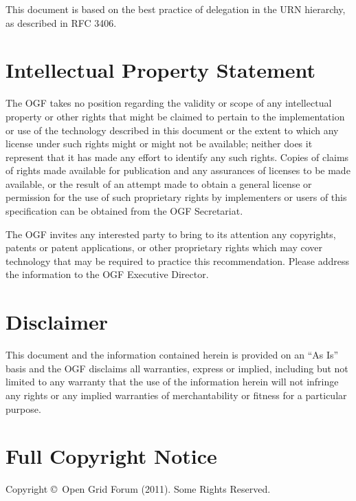 \documentclass[12pt]{article}  %
\newcommand{\copyrightyears}{2011}  %
\begin{document}
This document is based on the best practice of delegation in the URN hierarchy, 
as described in RFC 3406.

\section*{Intellectual Property Statement}

The OGF takes no position regarding the validity or scope of any intellectual
property or other rights that might be claimed to pertain to the
implementation or use of the technology described in this document or the
extent to which any license under such rights might or might not be
available; neither does it represent that it has made any effort to identify
any such rights. Copies of claims of rights made available for publication
and any assurances of licenses to be made available, or the result of an
attempt made to obtain a general license or permission for the use of such
proprietary rights by implementers or users of this specification can be
obtained from the OGF Secretariat.

The OGF invites any interested party to bring to its attention any
copyrights, patents or patent applications, or other proprietary rights which
may cover technology that may be required to practice this recommendation.
Please address the information to the OGF Executive Director.

\section*{Disclaimer}

This document and the information contained herein is provided on an ``As
Is'' basis and the OGF disclaims all warranties, express or implied,
including but not limited to any warranty that the use of the information
herein will not infringe any rights or any implied warranties of
merchantability or fitness for a particular purpose.

\section*{Full Copyright Notice}

Copyright \copyright \ Open Grid Forum (\copyrightyears). Some Rights Reserved.
\end{document}
